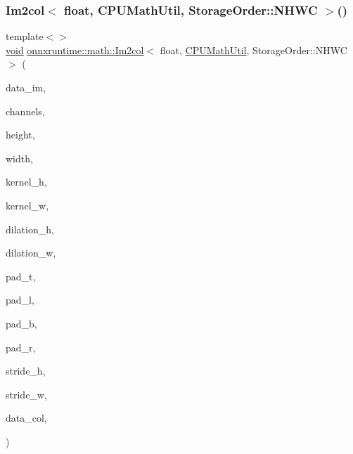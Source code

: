 \subsubsection{\texorpdfstring{Im2col$<$ float, C\+P\+U\+Math\+Util, Storage\+Order\+::\+N\+H\+W\+C $>$()}{Im2col< float, CPUMathUtil, StorageOrder::NHWC >()}}
{\footnotesize\ttfamily template$<$$>$ \\
\mbox{\hyperlink{mlasi_8h_a88f941d423cb2a819b70a1358982b1a6}{void}} \mbox{\hyperlink{namespaceonnxruntime_1_1math_a5f4da90f31ab7005ff9eb336534d62e9}{onnxruntime\+::math\+::\+Im2col}}$<$ float, \mbox{\hyperlink{classonnxruntime_1_1CPUMathUtil}{C\+P\+U\+Math\+Util}}, Storage\+Order\+::\+N\+H\+WC $>$ (\begin{DoxyParamCaption}\item[{const float $\ast$}]{data\+\_\+im,  }\item[{const int64\+\_\+t}]{channels,  }\item[{const int64\+\_\+t}]{height,  }\item[{const int64\+\_\+t}]{width,  }\item[{const int64\+\_\+t}]{kernel\+\_\+h,  }\item[{const int64\+\_\+t}]{kernel\+\_\+w,  }\item[{const int64\+\_\+t}]{dilation\+\_\+h,  }\item[{const int64\+\_\+t}]{dilation\+\_\+w,  }\item[{const int64\+\_\+t}]{pad\+\_\+t,  }\item[{const int64\+\_\+t}]{pad\+\_\+l,  }\item[{const int64\+\_\+t}]{pad\+\_\+b,  }\item[{const int64\+\_\+t}]{pad\+\_\+r,  }\item[{const int64\+\_\+t}]{stride\+\_\+h,  }\item[{const int64\+\_\+t}]{stride\+\_\+w,  }\item[{float $\ast$}]{data\+\_\+col,  }\item[{\mbox{\hyperlink{classonnxruntime_1_1CPUMathUtil}{C\+P\+U\+Math\+Util}} $\ast$}]{ }\end{DoxyParamCaption})}

\mbox{\label{namespaceonnxruntime_1_1math_abf43727838ab5d569e1bc070bc23a166}} 
